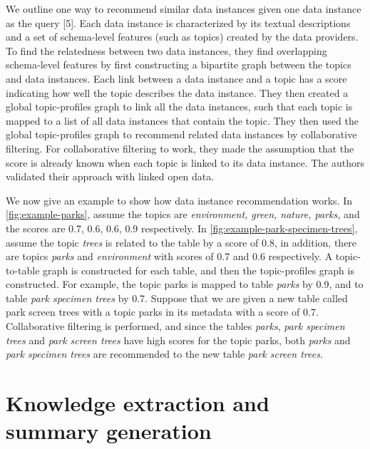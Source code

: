 We outline one way to recommend similar data instances given one data instance as the query \cite{conf/esws/EllefiBDT16}[5]. Each data instance is characterized by its textual descriptions and a set of schema-level features (such as topics) created by the data providers. To find the relatedness between two data instances, they find overlapping schema-level features by first constructing a bipartite graph between the topics and data instances. Each link between a data instance and a topic has a score indicating how well the topic describes the data instance. They then created a global topic-profiles graph to link all the data instances, such that each topic is mapped to a list of all data instances that contain the topic. They then used the global topic-profiles graph to recommend related data instances by collaborative filtering. For collaborative filtering to work, they made the assumption that the score is already known when each topic is linked to its data instance. The authors validated their approach with linked open data.

We now give an example to show how data instance recommendation works. In \autoref{fig:example-parks}, assume the topics are \textit{environment, green, nature, parks,} and the scores are 0.7, 0.6, 0.6, 0.9 respectively. In \autoref{fig:example-park-specimen-trees}, assume the topic \textit{trees} is related to the table by a score of 0.8, in addition, there are topics \textit{parks} and \textit{environment} with scores of 0.7 and 0.6 respectively. A topic-to-table graph is constructed for each table, and then the topic-profiles graph is constructed. For example, the topic parks is mapped to table \textit{parks} by 0.9, and to table \textit{park specimen trees} by 0.7. Suppose that we are given a new table called park screen trees with a topic parks in its metadata with a score of 0.7. Collaborative filtering is performed, and since the tables \textit{parks}, \textit{park specimen trees} and \textit{park screen trees} have high scores for the topic parks, both \textit{parks} and \textit{park specimen trees} are recommended to the new table \textit{park screen trees}.

\section{Knowledge extraction and summary generation}
\label{sec:KnowledgeExtractionAndSummaryGeneration}

